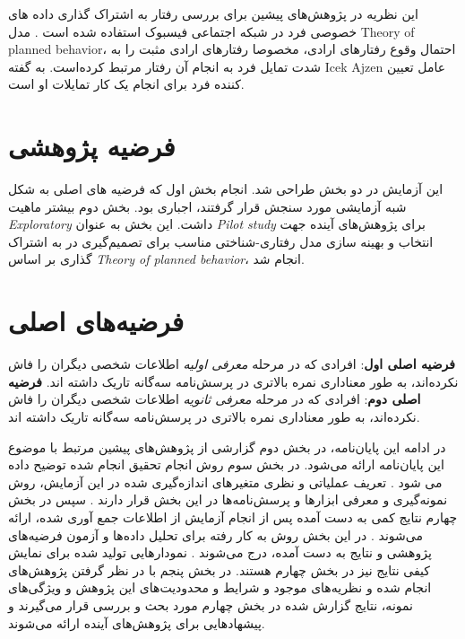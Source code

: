   این نظریه در پژوهش‌های پیشین برای بررسی رفتار
  به اشتراک گذاری داده های خصوصی
  فرد در شبکه اجتماعی فیسبوک استفاده شده است
  \!\citep{vanderschyffInformationPrivacyBehavior2020}
  \!.
  مدل
  \gls{Theory of planned behavior}،
    احتمال وقوع  رفتار‌های ارادی، مخصوصا رفتار‌های ارادی مثبت را به شدت تمایل فرد به
  انجام آن رفتار مرتبط کرده‌است. به گفته
  \gls{Icek Ajzen}
  عامل تعیین کننده فرد برای انجام یک کار تمایلات او است.
\fi



\section{فرضیه پژوهشی}
این آزمایش در دو بخش  طراحی شد. انجام بخش اول که فرضیه های اصلی به شکل شبه آزمایشی مورد سنجش قرار گرفتند، اجباری بود. بخش دوم بیشتر ماهیت 
\textit{
      \gls{Exploratory}
    }
داشت. این بخش به عنوان
\textit{
      \gls{Pilot study}
    }
  برای پژوهش‌های آینده جهت انتخاب و  بهینه سازی مدل رفتاری-شناختی مناسب برای تصمیم‌گیری در به اشتراک گذاری بر اساس 
  \textit{\gls{Theory of planned behavior}}،
   انجام شد.
\section*{فرضیه‌های اصلی}
\textbf{فرضیه‌ اصلی اول}: 
افرادی که در مرحله
\textit{معرفی اولیه}
 اطلاعات شخصی دیگران را فاش نکرده‌اند، به طور معناداری نمره بالاتری در پرسش‌نامه سه‌گانه تاریک داشته اند.
 \textbf{فرضیه‌ اصلی دوم}: 
 افرادی که در مرحله
 \textit{معرفی ثانویه}
  اطلاعات شخصی دیگران را فاش نکرده‌اند، به طور معناداری نمره بالاتری در پرسش‌نامه سه‌گانه تاریک داشته اند.
 


در ادامه این پایان‌نامه، در بخش دوم گزارشی از پژوهش‌های پیشین مرتبط با موضوع این پایان‌نامه ارائه می‌شود.
در بخش سوم روش انجام تحقیق انجام شده توضیح داده می شود
\!.
تعریف عملیاتی و نظری متغیر‌های اندازه‌گیری شده در این آزمایش، روش نمونه‌گیری و معرفی ابزارها و پرسش‌نامه‌ها در این بخش قرار دارند
\!.
سپس در بخش چهارم نتایج کمی به دست آمده پس از انجام آزمایش از اطلاعات جمع آوری شده، ارائه می‌شوند
\!.
در این بخش  روش به کار رفته برای تحلیل داده‌ها و آزمون فرضیه‌های پژوهشی و نتایج  به دست آمده، درج  می‌شوند
\!.
نمودار‌هایی تولید شده برای نمایش کیفی نتایج نیز در بخش چهارم هستند.
در بخش پنجم با در نظر گرفتن پژوهش‌های انجام شده و نظریه‌های موجود و شرایط و محدودیت‌های این پژوهش و ویژگی‌های نمونه، نتایج گزارش شده در بخش چهارم مورد بحث و بررسی
قرار می‌گیرند و پیشهادهایی برای پژوهش‌های آینده ارائه می‌شوند.

